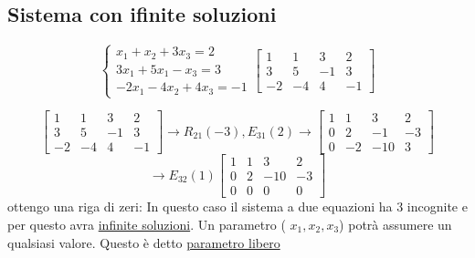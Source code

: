 \documentclass[12pt,a4paper,oneside]{article}
\begin{document}
\subsection{Sistema con ifinite soluzioni}
\[
	\begin{cases}
		x_1 + x_2 + 3x_3 = 2 \\
		3x_1 + 5x_1 -x_3 = 3 \\
		-2x_1 -4x_2 + 4x_3 = -1
	\end{cases}
	\begin{bmatrix}
		1  & 1  & 3  & 2  \\
		3  & 5  & -1 & 3  \\
		-2 & -4 & 4  & -1
	\end{bmatrix}
\]

\[
	\begin{bmatrix}
		1  & 1  & 3  & 2  \\
		3  & 5  & -1 & 3  \\
		-2 & -4 & 4  & -1
	\end{bmatrix}
	\rightarrow R_{21}\left( -3 \right) , E_{31}\left( 2 \right)
	\rightarrow
	\begin{bmatrix}
		1 & 1  & 3   & 2  \\
		0 & 2  & -1  & -3 \\
		0 & -2 & -10 & 3
	\end{bmatrix}
\]
\[
	\rightarrow E_{32}\left( 1 \right)
	\begin{bmatrix}
		1 & 1 & 3   & 2  \\
		0 & 2 & -10 & -3 \\
		0 & 0 & 0   & 0
	\end{bmatrix}
\]
ottengo una riga di zeri:
In questo caso il sistema a due equazioni ha 3 incognite e per questo avra \underline{infinite soluzioni}. Un parametro ( $x_1, x_2 ,x_3$) potrà assumere un qualsiasi valore. Questo è detto \underline{parametro libero}
\end{document}
